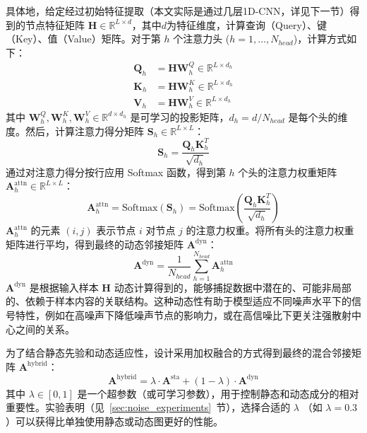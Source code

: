 具体地，给定经过初始特征提取（本文实际是通过几层1D-CNN，详见下一节）得到的节点特征矩阵 $\mathbf{H} \in \mathbb{R}^{L \times d}$，其中$d$为特征维度，计算查询（Query）、键（Key）、值（Value）矩阵。对于第 $h$ 个注意力头 ($h=1, \dots, N_{head}$)，计算方式如下：
\begin{align}
    \mathbf{Q}_h &= \mathbf{H} \mathbf{W}_h^Q \in \mathbb{R}^{L \times d_h} \\
    \mathbf{K}_h &= \mathbf{H} \mathbf{W}_h^K \in \mathbb{R}^{L \times d_h} \\
    \mathbf{V}_h &= \mathbf{H} \mathbf{W}_h^V \in \mathbb{R}^{L \times d_h}
\end{align}
其中 $\mathbf{W}_h^Q, \mathbf{W}_h^K, \mathbf{W}_h^V \in \mathbb{R}^{d \times d_h}$ 是可学习的投影矩阵，$d_h = d / N_{head}$ 是每个头的维度。然后，计算注意力得分矩阵 $\mathbf{S}_h \in \mathbb{R}^{L \times L}$：
\begin{equation}
    \mathbf{S}_h = \frac{\mathbf{Q}_h \mathbf{K}_h^T}{\sqrt{d_h}}
    \label{eq:attention_scores}
\end{equation}
通过对注意力得分按行应用 Softmax 函数，得到第 $h$ 个头的注意力权重矩阵 $\mathbf{A}_h^{\text{attn}} \in \mathbb{R}^{L \times L}$：
\begin{equation}
    \mathbf{A}_h^{\text{attn}} = \text{Softmax}(\mathbf{S}_h) = \text{Softmax}\left(\frac{\mathbf{Q}_h \mathbf{K}_h^T}{\sqrt{d_h}}\right)
    \label{eq:dynamic_adjacency_head}
\end{equation}
$\mathbf{A}_h^{\text{attn}}$ 的元素 $(i,j)$ 表示节点 $i$ 对节点 $j$ 的注意力权重。将所有头的注意力权重矩阵进行平均，得到最终的动态邻接矩阵 $\mathbf{A}^{\text{dyn}}$：
\begin{equation}
    \mathbf{A}^{\text{dyn}} = \frac{1}{N_{head}} \sum_{h=1}^{N_{head}} \mathbf{A}_h^{\text{attn}}
    \label{eq:dynamic_adjacency_final}
\end{equation}
$\mathbf{A}^{\text{dyn}}$ 是根据输入样本 $\mathbf{H}$ 动态计算得到的，能够捕捉数据中潜在的、可能非局部的、依赖于样本内容的关联结构。这种动态性有助于模型适应不同噪声水平下的信号特性，例如在高噪声下降低噪声节点的影响力，或在高信噪比下更关注强散射中心之间的关系。

为了结合静态先验和动态适应性，设计采用加权融合的方式得到最终的混合邻接矩阵 $\mathbf{A}^{\text{hybrid}}$：
\begin{equation}
    \mathbf{A}^{\text{hybrid}} = \lambda \cdot \mathbf{A}^{\text{sta}} + (1-\lambda) \cdot \mathbf{A}^{\text{dyn}}
    \label{eq:hybrid_adjacency}
\end{equation}
其中 $\lambda \in [0,1]$ 是一个超参数（或可学习参数），用于控制静态和动态成分的相对重要性。实验表明（见~\ref{sec:noise_experiments}~节），选择合适的 $\lambda$ （如 $\lambda=0.3$）可以获得比单独使用静态或动态图更好的性能。

